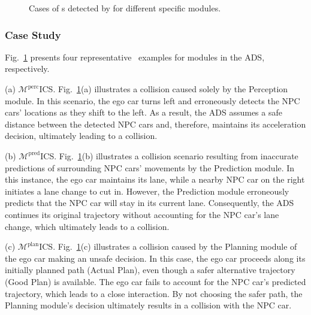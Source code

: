 \begin{figure}[!t]
    \centering
    \quad
    \quad
    \quad
    \caption{Cases of {\mccs}s detected by \tool for different specific modules.}
    \label{fig:case}
\end{figure}
\subsubsection{Case Study} Fig.~\ref{fig:case} presents four representative \mccs\ examples for modules in the ADS, respectively. 

(a) $\mathcal{M}^{\text{perc}}$ICS. Fig.~\ref{fig:case}(a) illustrates a collision caused solely by the Perception module. In this scenario, the ego car turns left and erroneously detects the NPC cars' locations as they shift to the left. As a result, the ADS assumes a safe distance between the detected NPC cars and, therefore, maintains its acceleration decision, ultimately leading to a collision.

(b) $\mathcal{M}^{\text{pred}}$ICS. Fig.~\ref{fig:case}(b) illustrates a collision scenario resulting from inaccurate predictions of surrounding NPC cars' movements by the Prediction module. In this instance, the ego car maintains its lane, while a nearby NPC car on the right initiates a lane change to cut in. However, the Prediction module erroneously predicts that the NPC car will stay in its current lane. Consequently, the ADS continues its original trajectory without accounting for the NPC car's lane change, which ultimately leads to a collision.

(c) $\mathcal{M}^{\text{plan}}$ICS. Fig.~\ref{fig:case}(c) illustrates a collision caused by the Planning module of the ego car making an unsafe decision. In this case, the ego car proceeds along its initially planned path (Actual Plan), even though a safer alternative trajectory (Good Plan) is available. The ego car fails to account for the NPC car's predicted trajectory, which leads to a close interaction. By not choosing the safer path, the Planning module's decision ultimately results in a collision with the NPC car.

